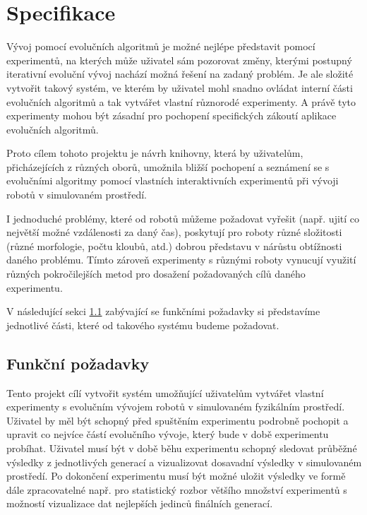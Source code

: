 \chapter{Specifikace}

Vývoj pomocí evolučních algoritmů je možné nejlépe představit pomocí
experimentů, na kterých může uživatel sám pozorovat změny, kterými postupný
iterativní evoluční vývoj nachází možná řešení na zadaný problém. Je ale
složité vytvořit takový systém, ve kterém by uživatel mohl snadno ovládat
interní části evolučních algoritmů a tak vytvářet vlastní různorodé
experimenty. A právě tyto experimenty mohou být zásadní pro pochopení
specifických zákoutí aplikace evolučních algoritmů.

Proto cílem tohoto projektu je návrh knihovny, která by uživatelům,
přicházejících z různých oborů, umožnila bližší pochopení a seznámení se s
evolučními algoritmy pomocí vlastních interaktivních experimentů při vývoji
robotů v simulovaném prostředí. 

I jednoduché problémy, které od robotů můžeme požadovat vyřešit (např. ujití co
největší možné vzdálenosti za daný čas), poskytují pro roboty různé složitosti
(různé morfologie, počtu kloubů, atd.) dobrou představu v nárůstu obtížnosti
daného problému. Tímto zároveň experimenty s různými roboty vynucují využití
různých pokročilejších metod pro dosažení požadovaných cílů daného experimentu.

V následující sekci \ref{Specifikace-funkčnípožadavky} zabývající se funkčními
požadavky si představíme jednotlivé části, které od takového systému budeme
požadovat.

\section{Funkční požadavky} \label{Specifikace-funkčnípožadavky}

Tento projekt cílí vytvořit systém umožňující uživatelům vytvářet vlastní
experimenty s evolučním vývojem robotů v simulovaném fyzikálním prostředí.
Uživatel by měl být schopný před spuštěním experimentu podrobně pochopit a
upravit co nejvíce částí evolučního vývoje, který bude v době experimentu
probíhat. Uživatel musí být v době běhu experimentu schopný sledovat průběžné
výsledky z jednotlivých generací a vizualizovat dosavadní výsledky v
simulovaném prostředí. Po dokončení experimentu musí být možné uložit
výsledky ve formě dále zpracovatelné např. pro statistický rozbor většího
množství experimentů s možností vizualizace dat nejlepších jedinců finálních
generací.

